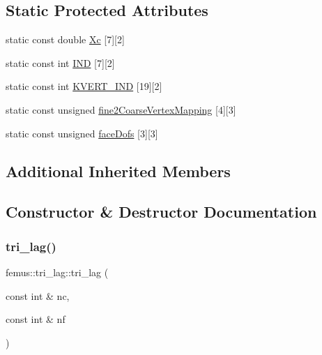 \subsection*{Static Protected Attributes}
\begin{DoxyCompactItemize}
\item 
static const double \mbox{\hyperlink{classfemus_1_1tri__lag_a35a3750fc9f95fbbd58a8996354fb21e}{Xc}} \mbox{[}7\mbox{]}\mbox{[}2\mbox{]}
\item 
static const int \mbox{\hyperlink{classfemus_1_1tri__lag_a717488b58cb6e6050732c3be7a2ca6dc}{I\+ND}} \mbox{[}7\mbox{]}\mbox{[}2\mbox{]}
\item 
static const int \mbox{\hyperlink{classfemus_1_1tri__lag_a13256425b871da2a83ba49f4a1436a6b}{K\+V\+E\+R\+T\+\_\+\+I\+ND}} \mbox{[}19\mbox{]}\mbox{[}2\mbox{]}
\item 
static const unsigned \mbox{\hyperlink{classfemus_1_1tri__lag_aa3ff4f6767a8c458c9c8231a850704f2}{fine2\+Coarse\+Vertex\+Mapping}} \mbox{[}4\mbox{]}\mbox{[}3\mbox{]}
\item 
static const unsigned \mbox{\hyperlink{classfemus_1_1tri__lag_a0b0e7301724709cf32a59929589f8794}{face\+Dofs}} \mbox{[}3\mbox{]}\mbox{[}3\mbox{]}
\end{DoxyCompactItemize}
\subsection*{Additional Inherited Members}


\subsection{Constructor \& Destructor Documentation}
\mbox{\label{classfemus_1_1tri__lag_a6a6eb55649360448493f953402f5d178}} 
\subsubsection{\texorpdfstring{tri\+\_\+lag()}{tri\_lag()}}
{\footnotesize\ttfamily femus\+::tri\+\_\+lag\+::tri\+\_\+lag (\begin{DoxyParamCaption}\item[{const int \&}]{nc,  }\item[{const int \&}]{nf }\end{DoxyParamCaption})\hspace{0.3cm}{\ttfamily [inline]}}



